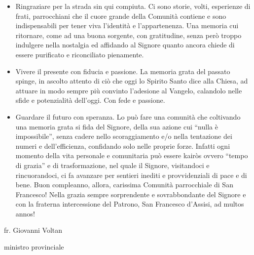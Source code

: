 \begin{itemize}
\item Ringraziare per la strada sin qui compiuta. Ci sono storie, volti, esperienze di frati, 
parrocchiani che il cuore grande della Comunità contiene e sono indispensabili per tener viva 
l’identità e l’appartenenza. Una memoria cui ritornare, come ad una buona sorgente, con 
gratitudine, senza però troppo indulgere nella nostalgia ed affidando al Signore quanto ancora 
chiede di essere purificato e riconciliato pienamente.
\item Vivere il presente con fiducia e passione. La memoria grata del passato spinge, in ascolto 
attento di ciò che oggi lo Spirito Santo dice alla Chiesa, ad attuare in modo sempre più convinto 
l’adesione al Vangelo, calandolo nelle sfide e potenzialità dell’oggi. Con fede e passione.
\item Guardare il futuro con speranza. Lo può fare una comunità che coltivando una memoria 
grata si fida del Signore, della sua azione cui “nulla è impossibile”, senza cadere nello 
scoraggiamento e/o nella tentazione dei numeri e dell’efficienza, confidando solo nelle proprie 
forze. Infatti ogni momento della vita personale e comunitaria può essere kairòs ovvero “tempo di 
grazia” e di trasformazione, nel quale il Signore, visitandoci e rincuorandoci, ci fa avanzare per 
sentieri inediti e provvidenziali di pace e di bene.
\bigbreak
Buon compleanno, allora, carissima Comunità parrocchiale di San Francesco! Nella grazia sempre 
sorprendente e sovrabbondante del Signore e con la fraterna intercessione del Patrono, San 
Francesco d’Assisi,  ad multos annos!
\end{itemize}
\begin{flushright}
fr. Giovanni Voltan\par
ministro provinciale
\end{flushright}
